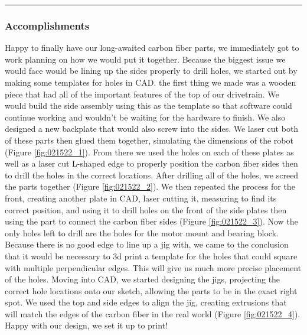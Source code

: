 \noindent\hfil\rule{\textwidth}{.4pt}\hfil

\subsubsection*{Accomplishments}
Happy to finally have our long-awaited carbon fiber parts, we immediately got to work planning on how we would put it together. Because the biggest issue we would face would be lining up the sides properly to drill holes, we started out by making some templates for holes in CAD. the first thing we made was a wooden piece that had all of the important features of the top of our drivetrain. We would build the side assembly using this as the template so that software could continue working and wouldn’t be waiting for the hardware to finish. We also designed a new backplate that would also screw into the sides. We laser cut both of these parts then glued them together, simulating the dimensions of the robot (Figure \ref{fig:021522_1}). From there we used the holes on each of these plates as well as a laser cut L-shaped edge to properly position the carbon fiber sides then to drill the holes in the correct locations. After drilling all of the holes, we screed the parts together (Figure \ref{fig:021522_2}). We then repeated the process for the front, creating another plate in CAD, laser cutting it, measuring to find its correct position, and using it to drill holes on the front of the side plates then using the part to connect the carbon fiber sides (Figure \ref{fig:021522_3}). 
Now the only holes left to drill are the holes for the motor mount and bearing block. Because there is no good edge to line up a jig with, we came to the conclusion that it would be necessary to 3d print a template for the holes that could square with multiple perpendicular edges. This will give us much more precise placement of the holes. Moving into CAD, we started designing the jigs, projecting the correct hole locations onto our sketch, allowing the parts to be in the exact right spot. We used the top and side edges to align the jig, creating extrusions that will match the edges of the carbon fiber in the real world (Figure \ref{fig:021522_4}). Happy with our design, we set it up to print!

